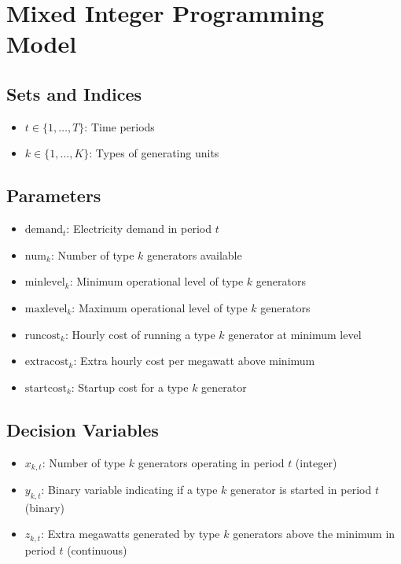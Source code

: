 \documentclass{article}
\begin{document}
\section*{Mixed Integer Programming Model}

\subsection*{Sets and Indices}
\begin{itemize}
    \item \( t \in \{1, \ldots, T\} \): Time periods
    \item \( k \in \{1, \ldots, K\} \): Types of generating units
\end{itemize}

\subsection*{Parameters}
\begin{itemize}
    \item \( \text{demand}_t \): Electricity demand in period \( t \)
    \item \( \text{num}_k \): Number of type \( k \) generators available
    \item \( \text{minlevel}_k \): Minimum operational level of type \( k \) generators
    \item \( \text{maxlevel}_k \): Maximum operational level of type \( k \) generators
    \item \( \text{runcost}_k \): Hourly cost of running a type \( k \) generator at minimum level
    \item \( \text{extracost}_k \): Extra hourly cost per megawatt above minimum
    \item \( \text{startcost}_k \): Startup cost for a type \( k \) generator
\end{itemize}

\subsection*{Decision Variables}
\begin{itemize}
    \item \( x_{k,t} \): Number of type \( k \) generators operating in period \( t \) (integer)
    \item \( y_{k,t} \): Binary variable indicating if a type \( k \) generator is started in period \( t \) (binary)
    \item \( z_{k,t} \): Extra megawatts generated by type \( k \) generators above the minimum in period \( t \) (continuous)
\end{itemize}
\end{document}
